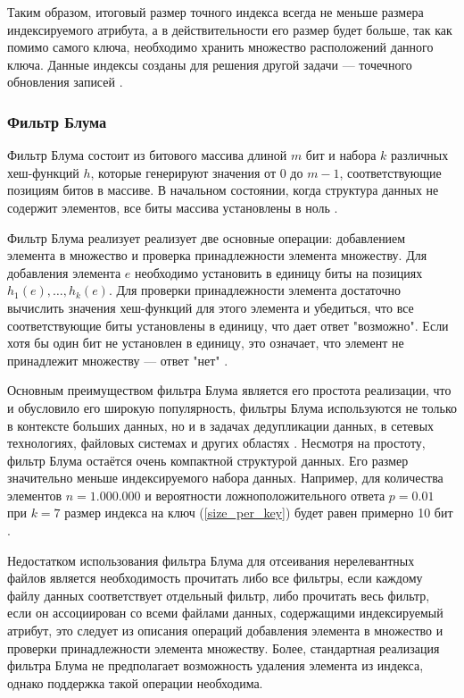 Таким образом, итоговый размер точного индекса всегда не меньше размера индексируемого атрибута, а в действительности его размер будет больше, так как помимо самого ключа, необходимо хранить множество расположений данного ключа. Данные индексы созданы для решения другой задачи --- точечного обновления записей \cite{Hudi_RLI}.

\subsubsection{Фильтр Блума} 

Фильтр Блума состоит из битового массива длиной $m$ бит и набора $k$ различных хеш-функций $h$, которые генерируют значения от $0$ до $m−1$, соответствующие позициям битов в массиве. В начальном состоянии, когда структура данных не содержит элементов, все биты массива установлены в ноль \cite{Bloom_Filter}.

Фильтр Блума реализует реализует две основные операции: добавлением элемента в множество и проверка принадлежности элемента множеству. Для добавления элемента $e$ необходимо установить в единицу биты на позициях $h_1(e), \dots, h_k(e)$. Для проверки принадлежности элемента достаточно вычислить значения хеш-функций для этого элемента и убедиться, что все соответствующие биты установлены в единицу, что дает ответ "возможно". Если хотя бы один бит не установлен в единицу, это означает, что элемент не принадлежит множеству — ответ "нет" \cite{Bloom_Filter,Role_of_bloom_filter_in_big_data}.

Основным преимуществом фильтра Блума является его простота реализации, что и обусловило его широкую популярность, фильтры Блума используются не только в контексте больших данных, но и в задачах дедупликации данных, в сетевых технологиях, файловых системах и других областях \cite{Role_of_bloom_filter_in_big_data}. Несмотря на простоту, фильтр Блума остаётся очень компактной структурой данных. Его размер значительно меньше индексируемого набора данных. Например, для количества элементов $n = 1.000.000$ и вероятности ложноположительного ответа $p = 0.01$ при $k = 7$ размер индекса на ключ (\ref{size_per_key}) будет равен примерно 10 бит \cite{Bloom_Filter}.

Недостатком использования фильтра Блума для отсеивания нерелевантных файлов является необходимость прочитать либо все фильтры, если каждому файлу данных соответствует отдельный фильтр, либо прочитать весь фильтр, если он ассоциирован со всеми файлами данных, содержащими индексируемый атрибут, это следует из описания операций добавления элемента в множество и проверки принадлежности элемента множеству. Более, стандартная реализация фильтра Блума не предполагает возможность удаления элемента из индекса, однако поддержка такой операции необходима.

